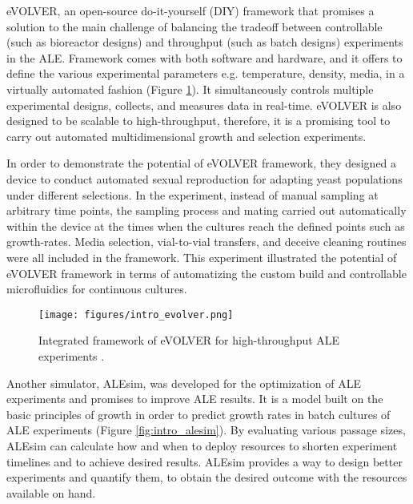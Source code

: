 eVOLVER\cite{wong2018precise}, an open-source do-it-yourself (DIY) framework that promises a solution to the main challenge of balancing the tradeoff between controllable (such as bioreactor designs) and throughput (such as batch designs) experiments in the ALE. Framework comes with both software and hardware, and it offers to define the various experimental parameters e.g. temperature, density, media, in a virtually automated fashion (Figure \ref{fig:intro_evolver}). It simultaneously controls multiple experimental designs, collects, and measures data in real-time. eVOLVER is also designed to be scalable to high-throughput, therefore, it is a promising tool to carry out automated multidimensional growth and selection experiments.

In order to demonstrate the potential of eVOLVER framework, they designed a device to conduct automated sexual reproduction for adapting yeast populations under different selections. In the experiment, instead of manual sampling at arbitrary time points, the sampling process and mating carried out automatically within the device at the times when the cultures reach the defined points such as growth-rates. Media selection, vial-to-vial transfers, and deceive cleaning routines were all included in the framework. This experiment illustrated the potential of eVOLVER framework in terms of automatizing the custom build and controllable microfluidics for continuous cultures.


\begin{figure}[H]
\begin{center}
\texttt{[image: figures/intro\_evolver.png]}
\caption[Integrated framework of eVOLVER for high-throughput ALE experiments \cite{wong2018precise}.]{Integrated framework of eVOLVER for high-throughput ALE experiments \cite{wong2018precise}.}
\label{fig:intro_evolver}
\end{center}
\end{figure}


Another simulator, ALEsim\cite{lacroix2017model}, was developed for the optimization of ALE experiments and promises to improve ALE results. It is a model built on the basic principles of growth in order to predict growth rates in batch cultures of ALE experiments (Figure \ref{fig:intro_alesim}). By evaluating various passage sizes, ALEsim can calculate how and when to deploy resources to shorten experiment timelines and to achieve desired results. ALEsim provides a way to design better experiments and quantify them, to obtain the desired outcome with the resources available on hand.

